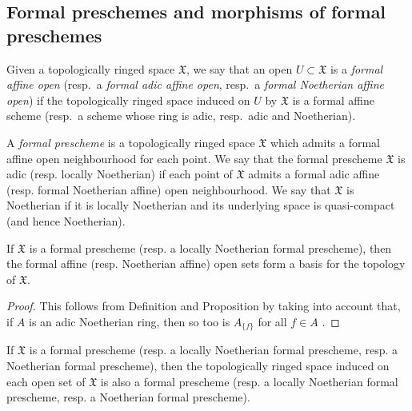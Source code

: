 \subsection{Formal preschemes and morphisms of formal preschemes}
\label{subsection:I.10.4}

\begin{env}[10.4.1]
\label{I.10.4.1}
Given a topologically ringed space $\mathfrak{X}$, we say that an open $U\subset\mathfrak{X}$ is a \emph{formal affine open} (resp.~a \emph{formal adic affine open}, resp.~a \emph{formal Noetherian affine open}) if the topologically ringed space induced on $U$ by $\mathfrak{X}$ is a formal affine scheme (resp.~a scheme whose ring is adic, resp.~adic and Noetherian).
\end{env}

\begin{definition}[10.4.2]
\label{I.10.4.2}
A \emph{formal prescheme} is a topologically ringed space $\mathfrak{X}$ which admits a formal affine open neighbourhood for each point.
We say that the formal prescheme $\mathfrak{X}$ is adic (resp. locally Noetherian) if each point of $\mathfrak{X}$ admits a formal adic affine (resp. formal Noetherian affine) open neighbourhood.
We say that $\mathfrak{X}$ is Noetherian if it is locally Noetherian and its underlying space is quasi-compact (and hence Noetherian).
\end{definition}

\begin{proposition}[10.4.3]
\label{I.10.4.3}
If $\mathfrak{X}$ is a formal prescheme (resp. a locally Noetherian formal prescheme), then the formal affine (resp. Noetherian affine) open sets form a basis for the topology of $\mathfrak{X}$.
\end{proposition}

\begin{proof}
This follows from Definition  and Proposition  by taking into account that, if $A$ is an adic Noetherian ring, then so too is $A_{\{f\}}$ for all $f\in A$ .
\end{proof}

\begin{corollary}[10.4.4]
\label{I.10.4.4}
If $\mathfrak{X}$ is a formal prescheme (resp. a locally Noetherian formal prescheme, resp. a Noetherian formal prescheme), then the topologically ringed space induced on each open set of $\mathfrak{X}$ is also a formal prescheme (resp. a locally Noetherian formal prescheme, resp. a Noetherian formal prescheme).
\end{corollary}

